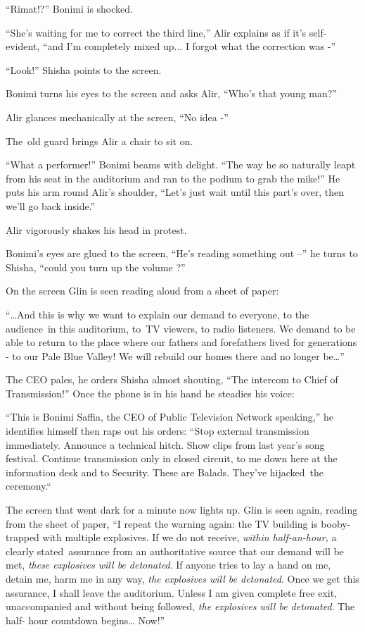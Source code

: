\documentclass[twoside,11pt]{book}
\begin{document}
``Rimat!?'' Bonimi is shocked.

``She's waiting for me to correct the third line,'' Alir explains as if it's self-evident,
``and I'm completely mixed up... I forgot what the correction was -''

``Look!'' Shisha points to the screen.

Bonimi turns his eyes to the screen and asks Alir, ``Who's that young man?''

Alir glances mechanically at the screen, ``No idea -''

The~old guard brings Alir a chair to sit on.

``What a performer!'' Bonimi beams with delight. ``The way he so naturally leapt
from his seat in the auditorium and ran to the podium to grab the mike!'' He puts his arm round Alir's
shoulder, ``Let's just wait until this part's over, then we'll go back inside.''

Alir vigorously shakes his head in protest.

Bonimi's eyes are glued to the screen, ``He's reading something out --'' he turns to Shisha,
``could you turn up the volume ?''

On the screen Glin is seen reading aloud from a sheet of paper:

``{\dots}And this is why we want to explain our demand to everyone, to the audience~in this auditorium,
to~TV viewers, to radio listeners. We demand to be able to return to the place where our fathers and forefathers lived
for generations - to our Pale Blue Valley! We will rebuild our homes there and no longer be{\dots}''

The CEO pales, he orders Shisha almost shouting, ``The intercom to Chief of Transmission!''
Once the phone is in his hand he steadies his voice:

``This is Bonimi Saffia, the CEO of Public Television Network speaking,'' he identifies
himself then raps out his orders: ``Stop external transmission immediately. Announce a technical hitch.
Show clips from last year's song festival. Continue transmission only in closed circuit, to me down here at the
information desk and to Security. These are Balads. They've hijacked~the ceremony.``~~~~~~

The screen that went dark for a minute now lights up. Glin is seen again, reading from the sheet of paper,
``I repeat the warning again: the TV building is booby-trapped with multiple explosives. If we do not
receive, \textit{within half-an-hour,} a clearly stated~assurance from an authoritative source that our demand will be
met, \textit{these explosives will be detonated}. If anyone tries to lay a hand on me, detain me, harm me in any way,
\textit{the explosives will be detonated}. Once we get this assurance, I shall leave the auditorium. Unless I am given
complete free exit, unaccompanied and without{ }being followed, \textit{the
explosives will be detonated}. The half- hour countdown begins{\dots} Now!''
\end{document}
